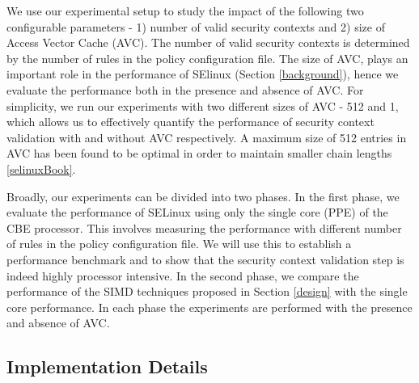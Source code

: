 \documentclass[conference]{IEEEtran}
\begin{document}
We use our experimental setup to study the impact of the following two configurable parameters - 1) number of valid security contexts and 2) size of Access Vector Cache (AVC). The number of valid
security contexts is determined by the number of rules in the policy
configuration file. The size of AVC, plays an important role in the performance of SElinux (Section \ref{background}), hence we evaluate
the performance both in the presence and absence of AVC. For
simplicity, we run our experiments with two different sizes of AVC -
512 and 1, which allows us to effectively quantify the performance of
security context validation with and without AVC respectively. A maximum size of 512 entries in AVC has been found to be optimal in order to maintain smaller chain lengths \ref{selinuxBook}.

Broadly, our experiments can be divided into two phases. In the first phase, we evaluate the performance of SELinux using only the single core (PPE) of the CBE processor. This involves measuring the performance with different number of rules in the policy configuration file. We will use this to establish a performance benchmark and to show that the security context validation step is indeed highly processor intensive. In the second phase, we compare the performance of the SIMD techniques proposed in Section \ref{design} with the single core performance. In each phase the experiments are performed with the presence and absence of AVC. 

\subsection{Implementation Details}
\end{document}
